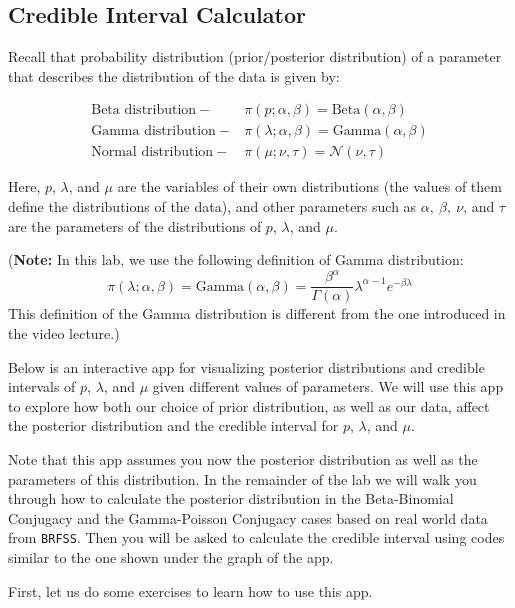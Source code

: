 \documentclass[
]{article}
\begin{document}
\hypertarget{credible-interval-calculator}{%
\subsection{Credible Interval
Calculator}\label{credible-interval-calculator}}

Recall that probability distribution (prior/posterior distribution) of a
parameter that describes the distribution of the data is given by:

\[\begin{align*}
\text{Beta distribution} ~-~ & \pi(p; \alpha, \beta) = \text{Beta}(\alpha, \beta)\\
\text{Gamma distribution} ~-~ & \pi(\lambda; \alpha, \beta) = \text{Gamma}(\alpha, \beta)\\
\text{Normal distribution} ~-~ & \pi(\mu; \nu, \tau) = \mathscr{N}(\nu, \tau)
\end{align*}\]

Here, \(p\), \(\lambda\), and \(\mu\) are the variables of their own
distributions (the values of them define the distributions of the data),
and other parameters such as \(\alpha,\ \beta,\ \nu\), and \(\tau\) are
the parameters of the distributions of \(p\), \(\lambda\), and \(\mu\).

(\textbf{Note:} In this lab, we use the following definition of Gamma
distribution:
\[ \pi(\lambda; \alpha, \beta) = \text{Gamma}(\alpha, \beta) = \frac{\beta^\alpha}{\Gamma(\alpha)}\lambda^{\alpha-1}e^{-\beta\lambda}\]
This definition of the Gamma distribution is different from the one
introduced in the video lecture.)

Below is an interactive app for visualizing posterior distributions and
credible intervals of \(p\), \(\lambda\), and \(\mu\) given different
values of parameters. We will use this app to explore how both our
choice of prior distribution, as well as our data, affect the posterior
distribution and the credible interval for \(p\), \(\lambda\), and
\(\mu\).

Note that this app assumes you now the posterior distribution as well as
the parameters of this distribution. In the remainder of the lab we will
walk you through how to calculate the posterior distribution in the
Beta-Binomial Conjugacy and the Gamma-Poisson Conjugacy cases based on
real world data from \texttt{BRFSS}. Then you will be asked to calculate
the credible interval using codes similar to the one shown under the
graph of the app.

First, let us do some exercises to learn how to use this app.
\end{document}
